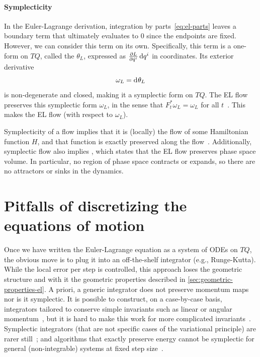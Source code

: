 \paragraph{Symplecticity}

In the Euler-Lagrange derivation, integration by parts~\eqref{eq:el-parts} leaves a boundary term that ultimately evaluates to $0$ since the endpoints are fixed. However, we can consider this term on its own. Specifically, this term is a one-form on $TQ$, called the  $\theta_L$, expressed as $\pdv{L}{\dot{q}^i}\odif{q^i}$ in coordinates. Its exterior derivative
\[
	\omega_L = \odif*{} \theta_L
\]
is non-degenerate and closed, making it a symplectic form on $TQ$. The EL flow preserves this symplectic form $\omega_L$, in the sense that $F_t^* \omega_L = \omega_L$ for all $t$~\cite[\S1.2.3]{marsdenDiscreteMechanicsVariational2001}. This makes the EL flow  (with respect to $\omega_L$).

Symplecticity of a flow implies that it is (locally) the flow of some Hamiltonian function $H$, and that function is exactly preserved along the flow~\cite{marsdenIntroductionMechanicsSymmetry1999}. Additionally, symplectic flow also implies , which states that the EL flow preserves phase space volume. In particular, no region of phase space contracts or expands, so there are no attractors or sinks in the dynamics.

\section{Pitfalls of discretizing the equations of motion}\label{sec:pitfalls-discrete-el-ode}

Once we have written the Euler-Lagrange equation as a system of ODEs on $TQ$, the obvious move is to plug it into an off-the-shelf integrator (e.g., Runge-Kutta). While the local error per step is controlled, this approach loses the geometric structure and with it the geometric properties described in \cref{sec:geometric-properties-el}. A priori, a generic integrator does not preserve momentum maps nor is it symplectic. It is possible to construct, on a case-by-case basis, integrators tailored to conserve simple invariants such as linear or angular momentum~\cite[\S\S IV.1--IV.2]{hairerGeometricNumericalIntegration2006}, but it is hard to make this work for more complicated invariants~\cite[Thm.~IV.3.3]{hairerGeometricNumericalIntegration2006}. Symplectic integrators (that are not specific cases of the variational principle) are rarer still~\cite[\S\S VI.4.1,~VI.6.3;~Thm.~IV.6.4]{hairerGeometricNumericalIntegration2006}; and algorithms that exactly preserve energy cannot be symplectic for general (non-integrable) systems at fixed step size~\cite[\S3]{zhongLiePoissonHamiltonJacobiTheory1988}.



